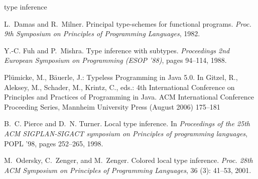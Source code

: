 type inference
\begin{thebibliography}{99}
L.~Damas and R.~Milner.
\newblock Principal type-schemes for functional programs.
\newblock \emph{Proc. 9th Symposium on Principles of Programming Languages},
  1982.

Y.-C. Fuh and P.~Mishra.
\newblock Type inference with subtypes.
\newblock \emph{Proceedings 2nd European Symposium on Programming ({ESOP
  '88})}, pages 94--114, 1988.

Pl{\"u}micke, M., B{\"a}uerle, J.:
\newblock Typeless {P}rogramming in {J}ava 5.0.
\newblock In Gitzel, R., Aleksey, M., Schader, M., Krintz, C., eds.: 4th
  {I}nternational {C}onference on {P}rinciples and {P}ractices of {P}rogramming
  in {J}ava. ACM International Conference Proceeding Series, Mannheim
  University Press (August 2006)  175--181

B.~C. Pierce and D.~N. Turner.
\newblock Local type inference.
\newblock In \emph{Proceedings of the 25th ACM SIGPLAN-SIGACT symposium on
  Principles of programming languages}, POPL '98, pages 252--265, 1998.

M.~Odersky, C.~Zenger, and M.~Zenger.
\newblock Colored local type inference.
\newblock \emph{Proc. 28th ACM Symposium on Principles of Programming
  Languages}, 36 (3): 41--53, 2001.

\end{thebibliography}
